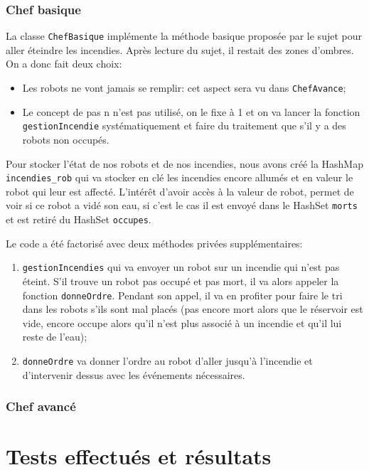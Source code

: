 \documentclass[a4paper,8pt]{article} %
\begin{document}
\subsubsection{Chef basique}
La  classe \texttt{ChefBasique} implémente la méthode basique proposée par le sujet pour aller éteindre les incendies.
Après lecture du sujet, il restait des zones d'ombres. On a donc fait deux choix:
\begin{itemize}
    \item Les robots ne vont jamais se remplir: cet aspect sera vu dans \texttt{ChefAvance};
    \item Le concept de pas n n'est pas utilisé, on le fixe à 1 et on va lancer la fonction \texttt{gestionIncendie} systématiquement 
    et faire du traitement que s'il y a des robots non occupés.
\end{itemize}

Pour stocker l'état de nos robots et de nos incendies, nous avons créé la HashMap \texttt{incendies\_rob} 
qui va stocker en clé les incendies encore allumés et en valeur le robot qui leur est affecté. L'intérêt d'avoir accès à la valeur de robot,
permet de voir si ce robot a vidé son eau, si c'est le cas il est envoyé dans le HashSet \texttt{morts} et est retiré du HashSet \texttt{occupes}.

Le code a été factorisé avec deux méthodes privées supplémentaires:
\begin{enumerate}
    \item \texttt{gestionIncendies} qui va envoyer un robot sur un incendie qui n'est pas éteint. S'il trouve un robot pas occupé et pas mort,
    il va alors appeler la fonction \texttt{donneOrdre}. Pendant son appel, il va en profiter pour faire le tri dans les robots s'ils sont
    mal placés (pas encore mort alors que le réservoir est vide, encore occupe alors qu'il n'est plus associé à un incendie et qu'il lui reste
    de l'eau);
    \item \texttt{donneOrdre} va donner l'ordre au robot d'aller jusqu'à l'incendie et d'intervenir dessus avec les événements nécessaires.
\end{enumerate}

\subsubsection{Chef avancé}
\section{Tests effectués et résultats}
\end{document}
